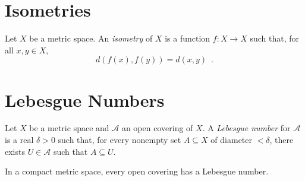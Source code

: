 \section{Isometries}

\begin{df}[Isometry]
  Let $X$ be a metric space. An \emph{isometry} of $X$ is a function $f : X
  \rightarrow X$ such that, for all $x, y \in X$,
  \[ d(f(x), f(y)) = d(x, y) \enspace . \]
\end{df}

\section{Lebesgue Numbers}

\begin{df}
  Let $X$ be a metric space and $\mathcal{A}$ an open covering of $X$. A
  \emph{Lebesgue number} for $\mathcal{A}$ is a real $\delta > 0$ such that,
  for every nonempty set $A \subseteq X$ of diameter $< \delta$, there exists
  $U \in \mathcal{A}$ such that $A \subseteq U$.
\end{df}

\begin{lm}
  In a compact metric space, every open covering has a Lebesgue number.
\end{lm}

